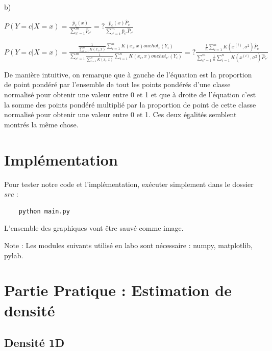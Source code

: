 \documentclass[a4paper,10pt]{article}
\begin{document}
b)

$P(Y=c | X=x)  = \frac{ \hat{p}_{c}(x) }{ \sum_{c'=1}^{m} \hat{p}_{c'} } =?  \frac{ \hat{p}_{c}(x) \hat{P}_{c}}{ \sum_{c'=1}^{m} \hat{p}_{c'} \hat{P}_{c'} } $

$P(Y=c | X=x)  = \frac{ \frac{1}{ \sum_{i=1}^{n} K(x_{i}, x) } \sum_{i=1}^{n} K(x_{i}, x) onehot_{c}(Y_{i}) }{ \sum_{c'=1}^{m} \frac{1}{ \sum_{i=1}^{n} K(x_{i}, x) } \sum_{i=1}^{n} K(x_{i}, x) onehot_{c'}(Y_{i}) } =?  \frac{  \frac{1}{n} \sum_{i=1}^{n} K(x^{(i)}, \sigma^{2})  \hat{P}_{c}}{ \sum_{c'=1}^{m}  \frac{1}{n} \sum_{i=1}^{n} K(x^{(i)}, \sigma^{2})  \hat{P}_{c'} } $

De manière intuitive, on remarque que à gauche de l'équation est la proportion de point pondéré par l'ensemble de tout les points pondérés d'une classe normalisé pour obtenir une valeur entre 0 et 1 et que à droite de l'équation c'est la somme des points pondéré multiplié par la proportion de point de cette classe normalisé pour obtenir une valeur entre 0 et 1. Ces deux égalités semblent montrés la même chose.


\section{Implémentation}

Pour tester notre code et l'implémentation, exécuter simplement dans le dossier $src$ :
\begin{verbatim}
	python main.py
\end{verbatim}
L'ensemble des graphiques vont être sauvé comme image.

Note : Les modules suivants utilisé en labo sont nécessaire : numpy, matplotlib, pylab.


\section{Partie Pratique : Estimation de densité}

\subsection{Densité 1D}
\end{document}
